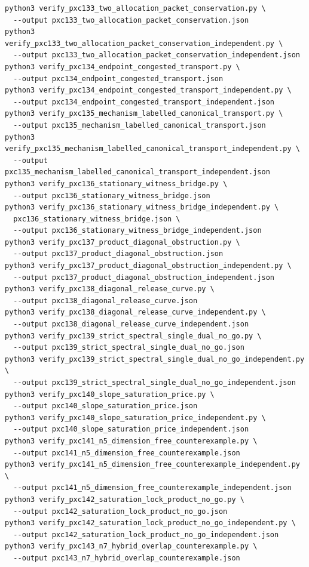 \documentclass[11pt]{article}
\begin{document}
\begin{verbatim}
python3 verify_pxc133_two_allocation_packet_conservation.py \
  --output pxc133_two_allocation_packet_conservation.json
python3 verify_pxc133_two_allocation_packet_conservation_independent.py \
  --output pxc133_two_allocation_packet_conservation_independent.json
python3 verify_pxc134_endpoint_congested_transport.py \
  --output pxc134_endpoint_congested_transport.json
python3 verify_pxc134_endpoint_congested_transport_independent.py \
  --output pxc134_endpoint_congested_transport_independent.json
python3 verify_pxc135_mechanism_labelled_canonical_transport.py \
  --output pxc135_mechanism_labelled_canonical_transport.json
python3 verify_pxc135_mechanism_labelled_canonical_transport_independent.py \
  --output pxc135_mechanism_labelled_canonical_transport_independent.json
python3 verify_pxc136_stationary_witness_bridge.py \
  --output pxc136_stationary_witness_bridge.json
python3 verify_pxc136_stationary_witness_bridge_independent.py \
  pxc136_stationary_witness_bridge.json \
  --output pxc136_stationary_witness_bridge_independent.json
python3 verify_pxc137_product_diagonal_obstruction.py \
  --output pxc137_product_diagonal_obstruction.json
python3 verify_pxc137_product_diagonal_obstruction_independent.py \
  --output pxc137_product_diagonal_obstruction_independent.json
python3 verify_pxc138_diagonal_release_curve.py \
  --output pxc138_diagonal_release_curve.json
python3 verify_pxc138_diagonal_release_curve_independent.py \
  --output pxc138_diagonal_release_curve_independent.json
python3 verify_pxc139_strict_spectral_single_dual_no_go.py \
  --output pxc139_strict_spectral_single_dual_no_go.json
python3 verify_pxc139_strict_spectral_single_dual_no_go_independent.py \
  --output pxc139_strict_spectral_single_dual_no_go_independent.json
python3 verify_pxc140_slope_saturation_price.py \
  --output pxc140_slope_saturation_price.json
python3 verify_pxc140_slope_saturation_price_independent.py \
  --output pxc140_slope_saturation_price_independent.json
python3 verify_pxc141_n5_dimension_free_counterexample.py \
  --output pxc141_n5_dimension_free_counterexample.json
python3 verify_pxc141_n5_dimension_free_counterexample_independent.py \
  --output pxc141_n5_dimension_free_counterexample_independent.json
python3 verify_pxc142_saturation_lock_product_no_go.py \
  --output pxc142_saturation_lock_product_no_go.json
python3 verify_pxc142_saturation_lock_product_no_go_independent.py \
  --output pxc142_saturation_lock_product_no_go_independent.json
python3 verify_pxc143_n7_hybrid_overlap_counterexample.py \
  --output pxc143_n7_hybrid_overlap_counterexample.json

\end{verbatim}
\end{document}

